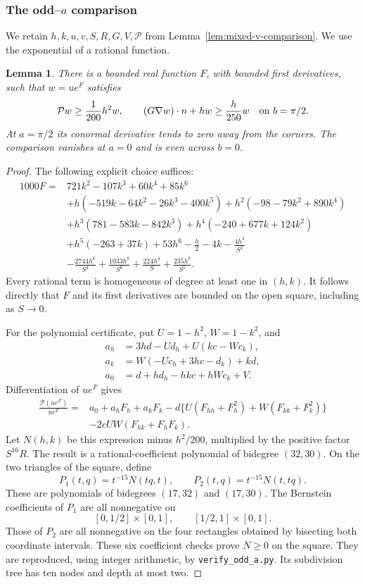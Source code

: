 \documentclass[reqno,11pt]{amsart}
\numberwithin{equation}{section}
\newtheorem{lemma}[theorem]{Lemma}
\theoremstyle{remark}
\begin{document}
\subsubsection{The odd--$a$ comparison}
We retain $h,k,u,v,S,R,G,V,\mathcal P$ from Lemma~\ref{lem:mixed-v-comparison}.
We use the exponential of a rational function.

\begin{lemma}\label{lem:mixed-u-comparison}
There is a bounded real function $F$, with bounded first derivatives, such
that $w=u e^F$ satisfies
\[
 \mathcal P w\ge\frac1{200}h^2w,\qquad
 (G\nabla w)\cdot n+hw\ge\frac h{250}w
           \quad\hbox{on }b=\pi/2.
\]
At $a=\pi/2$ its conormal derivative tends to zero away from the
corners.  The comparison vanishes at $a=0$ and is even across $b=0$.
\end{lemma}
\begin{proof}
The following explicit choice suffices:
\begin{align*}
1000F={}&721k^2-107k^3+60k^4+85k^6\\
 &+h(-519k-64k^2-26k^3-400k^5)
       +h^2(-98-79k^2+890k^4)\\
 &+h^3(781-583k-842k^3)
       +h^4(-240+677k+124k^2)\\
 &+h^5(-263+37k)+53h^6
       -\frac h2-4k-\frac{4h^3}{S^2}\\
 &-\frac{2744h^6}{S^4}+\frac{1033h^8}{S^6}
       +\frac{224h^4}{S}+\frac{235h^8}{S^5}.
\end{align*}
Every rational term is homogeneous of degree at least one in $(h,k)$.
It follows directly that $F$ and its first derivatives are bounded on
the open square, including as $S\to0$.

For the polynomial certificate, put $U=1-h^2$,
$W=1-k^2$, and
\begin{align*}
 a_h&=3hd-Ud_h+U(kc-Wc_k),\\
 a_k&=W(-Uc_h+3hc-d_k)+kd,\\
 a_0&=d+hd_h-hkc+hWc_k+V.
\end{align*}
Differentiation of $u e^F$ gives
\begin{align*}
 \frac{\mathcal P(u e^F)}{u e^F}
 ={}&a_0+a_hF_h+a_kF_k
    -d\{U(F_{hh}+F_h^2)+W(F_{kk}+F_k^2)\}\\
    &-2cUW(F_{hk}+F_hF_k).
\end{align*}
Let $N(h,k)$ be this expression minus $h^2/200$, multiplied by the
positive factor $S^{16}R$.  The result is a rational-coefficient
polynomial of bidegree $(32,30)$.  On the two triangles of the square,
define
\[
 P_1(t,q)=t^{-15}N(tq,t),\qquad
 P_2(t,q)=t^{-15}N(t,tq).
\]
These are polynomials of bidegrees $(17,32)$ and $(17,30)$.
The Bernstein coefficients of $P_1$ are all nonnegative on
\[
 [0,1/2]\times[0,1],\qquad [1/2,1]\times[0,1].
\]
Those of $P_2$ are all nonnegative on the four rectangles obtained by
bisecting both coordinate intervals.  These six coefficient checks prove
$N\ge0$ on the square.  They are reproduced, using integer arithmetic,
by \texttt{verify\_odd\_a.py}.  Its subdivision tree
has ten nodes and depth at most two.


\end{proof}
\end{document}
